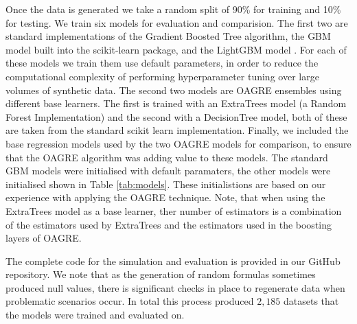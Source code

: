 \documentclass[graybox]{svmult}
\begin{document}
Once the data is generated we take a random split of 90\% for training and 10\% for testing. 
We train six models for evaluation and comparision. The first two are standard implementations of
the Gradient Boosted Tree algorithm, the GBM model built into the scikit-learn package, and
the LightGBM model \cite{Ke2017}. For each of these models we train them use default parameters,
in order to reduce the computational complexity of performing hyperparameter tuning over large volumes of synthetic
data. The second two models are OAGRE ensembles using different base learners. The first is trained with an 
ExtraTrees model (a Random Forest Implementation) and the second with a DecisionTree model, both of these are
taken from the standard scikit learn implementation. Finally, we included the base regression models used
by the two OAGRE models for comparison, to ensure that the OAGRE algorithm was adding value to these models.
The standard GBM models were initialised with default paramaters, the other models were initialised shown in 
Table \ref{tab:models}. These initialistions are based on our experience with applying the OAGRE technique.
Note, that when using the ExtraTrees model as a base learner, ther number of estimators is a combination of
the estimators used by ExtraTrees and the estimators used in the boosting layers of OAGRE.

\begin{table}
\caption{Simulation Parameters}
\label{tab:sim}
\end{table}

The complete code for the simulation and evaluation is provided in our GitHub repository. We note that as the
generation of random formulas sometimes produced null values, there is significant checks in place to regenerate
data when problematic scenarios occur. In total this process produced $2,185$ datasets that the models were
trained and evaluated on.
\end{document}
